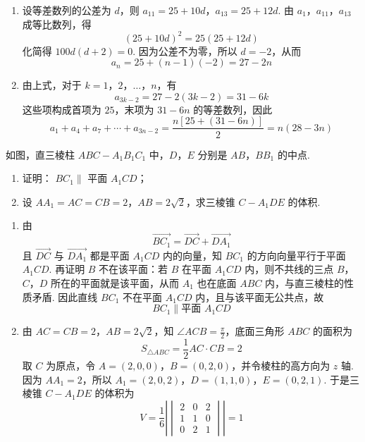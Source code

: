 \begin{solution}
\begin{enumerate}
\item 设等差数列的公差为 \(d\)，则 \(a_{11}=25+10d\)，\(a_{13}=25+12d\). 由 \(a_1\)，\(a_{11}\)，\(a_{13}\) 成等比数列，得
\[
(25+10d)^2=25(25+12d)
\]
化简得 \(100d(d+2)=0\). 因为公差不为零，所以 \(d=-2\)，从而
\[
a_n=25+(n-1)(-2)=27-2n
\]
\item 由上式，对于 \(k=1\)，\(2\)，\(\ldots\)，\(n\)，有
\[
a_{3k-2}=27-2(3k-2)=31-6k
\]
这些项构成首项为 \(25\)，末项为 \(31-6n\) 的等差数列，因此
\[
a_1+a_4+a_7+\cdots+a_{3n-2}
=\frac{n\left[25+(31-6n)\right]}{2}=n(28-3n)
\]
\end{enumerate}
\end{solution}

\begin{problem}
如图，直三棱柱 \(ABC - A_{1}B_{1}C_{1}\) 中，\(D\)，\(E\) 分别是 \(AB\)，\(BB_{1}\) 的中点.

\begin{enumerate}
\item 证明： \(BC_{1} \parallel\) 平面 \(A_{1}CD\)；
\item 设 \(AA_{1} = AC = CB = 2\)，\(AB = 2\sqrt{2}\)，求三棱锥 \(C - A_{1}DE\) 的体积.
\end{enumerate}

\end{problem}

\begin{solution}
\begin{enumerate}
\item 由
\[
\overrightarrow{BC_1}=\overrightarrow{DC}+\overrightarrow{DA_1}
\]
且 \(\overrightarrow{DC}\) 与 \(\overrightarrow{DA_1}\) 都是平面 \(A_1CD\) 内的向量，知 \(BC_1\) 的方向向量平行于平面 \(A_1CD\). 再证明 \(B\) 不在该平面：若 \(B\) 在平面 \(A_1CD\) 内，则不共线的三点 \(B\)，\(C\)，\(D\) 所在的平面就是该平面，从而 \(A_1\) 也在底面 \(ABC\) 内，与直三棱柱的性质矛盾. 因此直线 \(BC_1\) 不在平面 \(A_1CD\) 内，且与该平面无公共点，故
\[
BC_1\parallel\text{平面 }A_1CD
\]
\item 由 \(AC=CB=2\)，\(AB=2\sqrt{2}\)，知 \(\angle ACB=\frac{\pi}{2}\)，底面三角形 \(ABC\) 的面积为
\[
S_{\triangle ABC}=\frac12 AC\cdot CB=2
\]
取 \(C\) 为原点，令 \(A=(2,0,0)\)，\(B=(0,2,0)\)，并令棱柱的高方向为 \(z\) 轴. 因为 \(AA_1=2\)，所以 \(A_1=(2,0,2)\)，\(D=(1,1,0)\)，\(E=(0,2,1)\).
于是三棱锥 \(C-A_1DE\) 的体积为
\[
V=\frac16\left|\begin{vmatrix}
2&0&2\\
1&1&0\\
0&2&1
\end{vmatrix}\right|=1
\]
\end{enumerate}
\end{solution}

